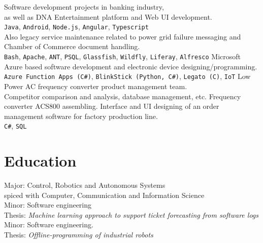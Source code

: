 \documentclass[letterpaper]{twentysecondcv}
\begin{document}
\begin{twenty} %
    {Software development projects in banking industry,\\
    as well as DNA Entertainment platform and Web UI development.\\
     \texttt{Java}, \texttt{Android}, \texttt{Node.js}, \texttt{Angular}, \texttt{Typescript} \\
  Also legacy service maintenance related to power grid failure messaging and Chamber of Commerce document handling.\\
     \texttt{Bash}, \texttt{Apache}, \texttt{ANT}, \texttt{PSQL}, \texttt{Glassfish}, \texttt{Wildfly}, \texttt{Liferay}, \texttt{Alfresco}}
    {Microsoft Azure based software development and electronic device designing/programming.\\
     \texttt{Azure Function Apps (C\#)}, \texttt{BlinkStick (Python, C\#)}, \texttt{Legato (C)}, \texttt{IoT}}
    {Low Power AC frequency converter product management team.\\
    Competitor comparison and analysis, database management, etc.}
    {Frequency converter ACS800 assembling.}
    {Interface and UI designing of an order management software for factory production line. \\
     \texttt{C\#}, \texttt{SQL}
    }
\end{twenty}




\section{Education}

\begin{twenty} %
  {Major: Control, Robotics and Autonomous Systems \\
  spiced with Computer, Communication and Information Science \\
  Minor: Software engineering \\
  Thesis: \emph{Machine learning approach to support ticket forecasting from software logs}}
  {Minor: Software engineering.
  \\Thesis: \emph{Offline-programming of industrial robots}}
\end{twenty}
\end{document}
